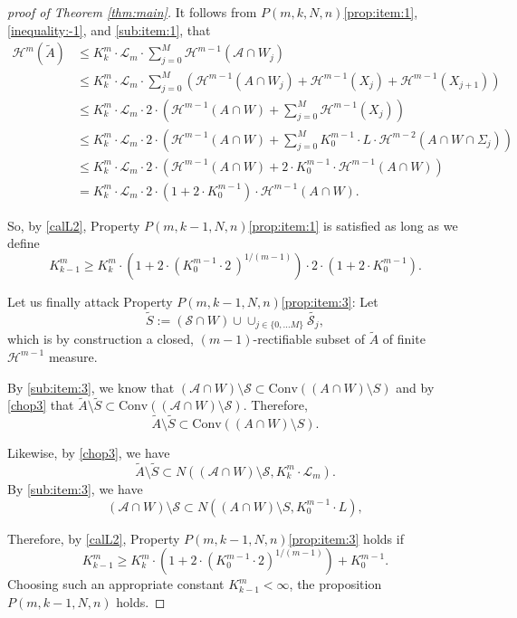 \documentclass[10pt]{amsart}
\theoremstyle{definition}
\theoremstyle{definition}
\theoremstyle{definition}
\theoremstyle{definition}
\theoremstyle{definition}
\theoremstyle{definition}
\theoremstyle{definition}
\newcommand{\<}{\langle}
\renewcommand{\>}{\rangle}
\def\i{\infty}
\def\co{\textrm{Conv}}
\def\cal{\mathcal}
\def\H{\mathcal{H}}
\newcommand{\eqnum}{\refstepcounter{equation}}
\begin{document}
\begin{proof}[proof of Theorem \ref{thm:main}]
	It follows from \( P(m,k,N,n) \)\ref{prop:item:1}, \eqref{inequality:-1}, and \eqref{sub:item:1}, that
	\begin{align*}
		\H^m(\tilde{A})&\leq K^m_k\cdot \cal{L}_m\cdot \sum_{j=0}^M \H^{m-1}(\cal{A}\cap W_j)\\
		&\leq K^m_k\cdot \cal{L}_m\cdot \sum_{j=0}^M \left(\H^{m-1}(A\cap W_j) + \H^{m-1}(X_j) + \H^{m-1}(X_{j+1})\right)\\
		&\leq K^m_k\cdot \cal{L}_m\cdot 2\cdot \left(\H^{m-1}(A\cap W) + \sum_{j=0}^M \H^{m-1}(X_j)\right)\\
		&\leq K^m_k\cdot \cal{L}_m\cdot 2\cdot \left(\H^{m-1}(A\cap W) + \sum_{j=0}^M K_0^{m-1} \cdot L \cdot \H^{m-2}(A\cap W\cap \Sigma_j) \right)\\
		&\leq K^m_k\cdot \cal{L}_m\cdot 2\cdot \left(\H^{m-1}(A\cap W) + 2\cdot K_0^{m-1} \cdot \H^{m-1}(A\cap W) \right)\\
		&= K^m_k\cdot \cal{L}_m\cdot 2\cdot \left(1 + 2\cdot K_0^{m-1} \right)\cdot \H^{m-1}(A\cap W).
	\end{align*}
	
	So, by \eqref{calL2}, Property \( P(m,k-1,N,n) \)\ref{prop:item:1} is satisfied as long as we define \[ K^m_{k-1} \geq K^m_k\cdot\left(1+2\cdot(K^{m-1}_0\cdot 2\,)^{1/(m-1)} \right)\cdot 2 \cdot \left(1 + 2\cdot K_0^{m-1} \right). \]

	Let us finally attack Property \( P(m,k-1,N,n) \)\ref{prop:item:3}: Let \[ \tilde{S}:=(\cal{S}\cap W)\cup \cup_{j\in \{0,\dots M\}} \tilde{\cal{S}_j}, \] which is by construction a closed, \( (m-1) \)-rectifiable subset of \( \tilde{A} \) of finite \( \H^{m-1} \) measure.
	
	By \eqref{sub:item:3}, we know that \( (\cal{A}\cap W)\setminus \cal{S} \subset \co((A\cap W)\setminus S) \) and by \eqref{chop3} that \( \tilde{A}\setminus\tilde{S} \subset \co((\cal{A}\cap W)\setminus \cal{S}) \). Therefore, \[ \tilde{A}\setminus\tilde{S} \subset \co((A\cap W)\setminus S). \]

	Likewise, by \eqref{chop3}, we have \[ \tilde{A}\setminus \tilde{S} \subset N\left((\cal{A}\cap W)\setminus \cal{S}, K^m_k\cdot \cal{L}_m\right). \] By \eqref{sub:item:3}, we have \[ (\cal{A}\cap W)\setminus \cal{S}\subset N\left((A\cap W)\setminus S, K^{m-1}_0\cdot L  \right), \]
	
	
	Therefore, by \eqref{calL2}, Property \( P(m,k-1,N,n) \)\ref{prop:item:3} holds if \[ K^m_{k-1} \geq K^m_k\cdot \left(1+2\cdot\left(K^{m-1}_0\cdot 2\right)^{1/(m-1)}\right) + K_0^{m-1}. \] Choosing such an appropriate constant \( K^m_{k-1}<\i \), the proposition \( P(m,k-1,N,n) \) holds.	
	\end{proof}

{}

\end{document}
